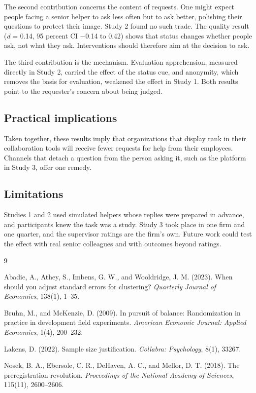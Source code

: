 \documentclass[11pt]{article}
\begin{document}
The second contribution concerns the content of requests. One might expect people facing a senior helper to ask less often but to ask better, polishing their questions to protect their image. Study 2 found no such trade. The quality result (\textit{d} = 0.14, 95 percent CI $-$0.14 to 0.42) shows that status changes whether people ask, not what they ask. Interventions should therefore aim at the decision to ask.

The third contribution is the mechanism. Evaluation apprehension, measured directly in Study 2, carried the effect of the status cue, and anonymity, which removes the basis for evaluation, weakened the effect in Study 1. Both results point to the requester's concern about being judged.

\subsection{Practical implications}

Taken together, these results imply that organizations that display rank in their collaboration tools will receive fewer requests for help from their employees. Channels that detach a question from the person asking it, such as the platform in Study 3, offer one remedy.

\subsection{Limitations}

Studies 1 and 2 used simulated helpers whose replies were prepared in advance, and participants knew the task was a study. Study 3 took place in one firm and one quarter, and the supervisor ratings are the firm's own. Future work could test the effect with real senior colleagues and with outcomes beyond ratings.

\begin{thebibliography}{9}
\setlength{\itemsep}{0pt}

Abadie, A., Athey, S., Imbens, G. W., and Wooldridge, J. M. (2023). When should you adjust standard errors for clustering? \textit{Quarterly Journal of Economics}, 138(1), 1--35.

Bruhn, M., and McKenzie, D. (2009). In pursuit of balance: Randomization in practice in development field experiments. \textit{American Economic Journal: Applied Economics}, 1(4), 200--232.

Lakens, D. (2022). Sample size justification. \textit{Collabra: Psychology}, 8(1), 33267.

Nosek, B. A., Ebersole, C. R., DeHaven, A. C., and Mellor, D. T. (2018). The preregistration revolution. \textit{Proceedings of the National Academy of Sciences}, 115(11), 2600--2606.

\end{thebibliography}
\end{document}
